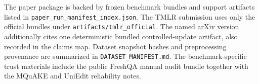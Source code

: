 The paper package is backed by frozen benchmark bundles and support artifacts listed in \texttt{paper\_run\_manifest\_index.json}. The TMLR submission uses only the official bundles under \texttt{artifacts/tmlr\_official}. The named arXiv version additionally cites one deterministic bundled controlled-update artifact, also recorded in the claims map. Dataset snapshot hashes and preprocessing provenance are summarized in \texttt{DATASET\_MANIFEST.md}. The benchmark-specific trust materials include the public FreshQA manual audit bundle together with the MQuAKE and UniEdit reliability notes.
